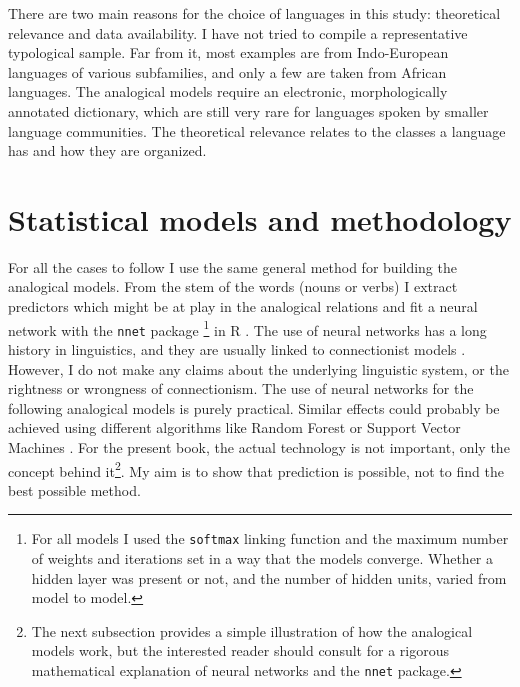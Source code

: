 There are two main reasons for the choice of languages in this study: theoretical relevance and data availability. I have not tried to compile a  representative typological sample. Far from it, most examples are from Indo-European languages of various subfamilies, and only a few are taken from African languages. The analogical models require an electronic, morphologically annotated dictionary, which are still very rare for languages spoken by smaller language communities. The theoretical relevance relates to the classes a language has and how they are organized.

\section{Statistical models and methodology}

For all the cases to follow I use the same general method for building the analogical models. From the stem of the words (nouns or verbs) I extract predictors which might be at play in the analogical relations and fit a neural network with the \texttt{nnet} package \autocite{Venables.2002}\footnote{For all models I used the \texttt{softmax} linking function and the maximum number of weights and iterations set in a way that the models converge. Whether a hidden layer was present or not, and the number of hidden units, varied from model to model.} in R \autocite{RDevelopmentCoreTeam.2008}. The use of neural networks has a long history in linguistics, and they are usually linked to connectionist models \autocite{Bechtel.2002, Churchland.1989, McClelland.1986, Rumelhart.1986}. However, I do not make any claims about the underlying linguistic system, or the rightness or wrongness of connectionism. The use of neural networks for the following analogical models is purely practical. Similar effects could probably be achieved using different algorithms like Random Forest \autocite{Breiman.2001a} or Support Vector Machines \autocites{Smola.1998, Scholkopf.2001}. For the present book, the actual technology is not important, only the concept behind it\footnote{The next subsection provides a simple illustration of how the analogical models work, but the interested reader should consult \textcite{Venables.2002} for a rigorous mathematical explanation of neural networks and the \texttt{nnet} package.}. My aim is to show that prediction is possible, not to find the best possible method.

